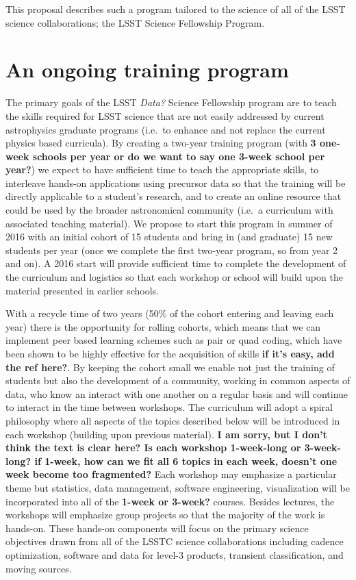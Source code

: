 \documentclass[nofootbib,floatfix,11pt]{article}
\begin{document}
This proposal describes such a program tailored to the science of all of the LSST science collaborations; the LSST Science Fellowship Program. 


\section{An ongoing training program}

The primary goals of the LSST {\em Data?} Science Fellowship program are to teach the skills required for LSST science that are not easily addressed by current astrophysics graduate programs (i.e.\ to enhance and not replace the current physics based curricula). By creating a two-year training program (with {\bf 3 one-week schools per year or do we want to say one 3-week school per year?}) we expect to have sufficient time to teach the appropriate skills, to interleave hands-on applications using precursor data so that the training will be directly applicable to a student's research, and to create an online resource that could be used by the broader astronomical community (i.e.\ a curriculum with associated teaching material).  We propose to start this program in summer of 2016 with an initial cohort of 15 students and bring in (and graduate) 15 new students per year (once we complete the first two-year program, so from year 2 and on). A 2016 start will provide sufficient time to complete the development of the curriculum and logistics so that each workshop or school will build upon the material presented in earlier schools.

With a recycle time of two years (50\% of the cohort entering and leaving each year) there is the opportunity for rolling cohorts, which means that we can implement peer based learning schemes such as pair or quad coding, which have been shown to be highly effective for the acquisition of skills {\bf if it's easy, add the ref here?}. By keeping the cohort small we enable not just the training of students but also the development of a community, working in common aspects of data, who know an interact with one another on a regular basis and will continue to interact in the time between workshops.  The curriculum will adopt a spiral philosophy where all aspects of the topics described below will be introduced in each workshop (building upon previous material). {\bf I am sorry, but I don't think the text is clear here? Is each workshop 1-week-long or 3-week-long? if 1-week, how can we fit all 6 topics in each week, doesn't one week become too fragmented?} Each workshop may emphasize a particular theme but statistics, data management, software engineering, visualization will be incorporated into all of the {\bf 1-week or 3-week?} courses. Besides lectures, the workshops will emphasize group projects so that the majority of the work is hands-on. These hands-on components will focus on the primary science objectives drawn from all of the LSSTC science collaborations including cadence optimization, software and data for level-3 products, transient classification, and moving sources.
\end{document}
